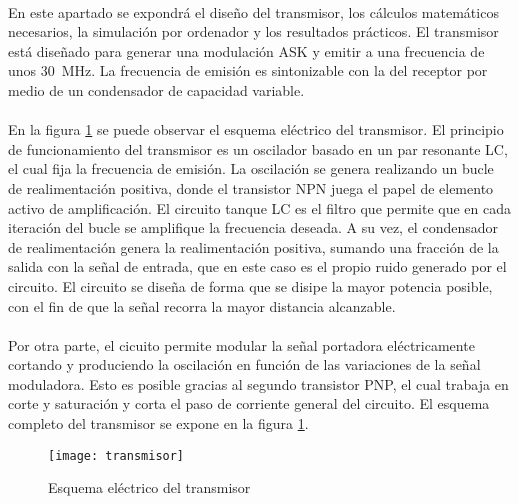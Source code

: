 \paragraph{}
En este apartado se expondr\'a el diseño del transmisor, los c\'alculos matem\'aticos necesarios, la simulaci\'on por ordenador y los resultados pr\'acticos.
El transmisor está diseñado para generar una modulación ASK y emitir a una frecuencia de unos \SI{30}{\mega\hertz}. La frecuencia de emisión es sintonizable con la del receptor por medio de un condensador de capacidad variable.
\paragraph{}
En la figura \ref{fig:tx} se puede observar el esquema eléctrico del transmisor.
El principio de funcionamiento del transmisor es un oscilador basado en un par resonante LC, el cual fija la frecuencia de emisión. 
La oscilaci\'on se genera realizando un bucle de realimentación positiva, donde el transistor NPN juega el papel de elemento activo de amplificación. 
El circuito tanque LC es el filtro que permite que en cada iteración del bucle se amplifique la frecuencia deseada. A su vez, el condensador de realimentación genera la realimentación positiva, sumando una fracción de la salida con la señal de entrada, que en este caso es el propio ruido generado por el circuito.
El circuito se diseña de forma que se disipe la mayor potencia posible, con el fin de que la señal recorra la mayor distancia alcanzable. 
\paragraph{}
Por otra parte, el cicuito permite modular la señal portadora eléctricamente cortando y produciendo la oscilación en función de las variaciones de la señal moduladora. Esto es posible gracias al segundo transistor PNP, el cual trabaja en corte y saturaci\'on y corta el paso de corriente general del circuito.
El esquema completo del transmisor se expone en la figura \ref{fig:tx}.

\begin{figure}[h]
    \centering
    \texttt{[image: transmisor]}
    \caption{Esquema el\'ectrico del transmisor}
    \label{fig:tx}
\end{figure}


